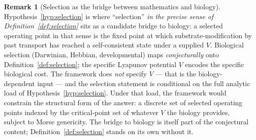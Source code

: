 \documentclass[11pt]{article}
\theoremstyle{definition}
\newtheorem{remark}[theorem]{Remark}
\begin{document}
\begin{remark}[Selection as the bridge between mathematics and biology]\label{rem:selection-biology}
Hypothesis~\ref{hyp:selection} is where ``selection'' \emph{in the precise sense of Definition~\ref{def:selection}} sits as a candidate bridge to biology: a selected operating point in that sense is the fixed point at which substrate-modification by past transport has reached a self-consistent state under a supplied $V$. Biological selection (Darwinian, Hebbian, developmental) maps \emph{conjecturally} onto Definition~\ref{def:selection}; the specific Lyapunov potential $V$ encodes the specific biological cost. The framework does \emph{not} specify $V$ --- that is the biology-dependent input --- and the selection statement is conditional on the full analytic load of Hypothesis~\ref{hyp:selection}. Under that load, the framework would constrain the structural form of the answer: a discrete set of selected operating points indexed by the critical-point set of whatever $V$ the biology provides, subject to Morse genericity. The bridge to biology is itself part of the conjectural content; Definition~\ref{def:selection} stands on its own without it.
\end{remark}
\end{document}
